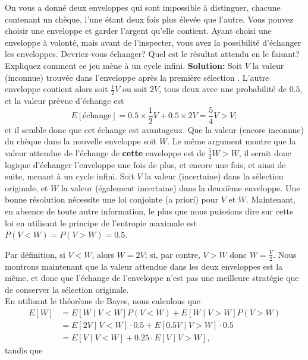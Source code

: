 \begin{Exemple}
On vous a donn\'e deux enveloppes qui sont impossible \`a distinguer, chacune contenant un ch\`eque, l'une \'etant deux fois plus \'elev\'ee que l'autre. Vous pouvez choisir une enveloppe et garder l'argent qu'elle contient. Ayant choisi une enveloppe \`a volont\'e, mais avant de l'inspecter, vous avez la possibilit\'e d'\'echanger les enveloppes. Devriez-vous \'echanger? Quel est le r\'esultat attendu en le faisant? Expliquez comment ce jeu m\`ene \`a un cycle infini. \newl \textbf{Solution:} Soit $V$ la valeur (inconnue) trouv\'ee dans l'enveloppe apr\`es la premi\`ere s\'election . L'autre enveloppe contient alors soit $\frac{1}{2}V$ ou soit $2V$,  tous deux avec une probabilit\'e de $0.5$, et la valeur pr\'evue d'\'echange est  $$E[\text{\'echange}]=0.5\times \frac{1}{2}V + 0.5 \times 2V = \frac{5}{4}V>V;$$ et il semble donc que cet \'echange est avantageux. Que la valeur (encore inconnue) du ch\`eque dans la nouvelle enveloppe soit $W$. Le même argument montre que la valeur attendue de l'\'echange de \textbf{cette} enveloppe est de $\frac{5}{4}W>W$, il serait donc logique d'\'echanger l'enveloppe une fois de plus, et encore une fois, et ainsi de suite, menant \`a un cycle infini.  Soit $V$ la valeur (incertaine) dans la s\'election originale, et $W$ la valeur (\'egalement incertaine) dans la deuxi\`eme enveloppe. Une bonne r\'esolution n\'ecessite une loi conjointe (a priori) pour $V$ et $W$. Maintenant, en absence de toute autre information, le plus que nous puissions dire sur cette loi en utilisant le principe de l'entropie maximale est $P(V<W)=P(V>W)=0.5$. \par Par d\'efinition, si $V<W$, alors $W=2V$; si, par contre, $V>W$ donc $W=\frac{V}{2}$. Nous montrons maintenant que la valeur attendue dans les deux enveloppes est la même, et donc que l'\'echange de l'enveloppe n'est pas une meilleure strat\'egie que de conserver la s\'election originale. \\ 
En utilisant le th\'eor\`eme de Bayes, nous calculons que 
\begin{equation*}
\begin{aligned}
E[W]&=E[W\mid V<W]P(V<W) + E[W\mid V>W]P(V>W) \\ &=E[2V\mid V<W]\cdot 0.5+E[0.5V\mid V>W]\cdot 0.5 \\ &= E[V\mid V<W]+0.25\cdot E[V\mid V>W],
\end{aligned}    
\end{equation*}
tandis que 
\begin{equation*}

\end{equation*}
\end{Exemple}

